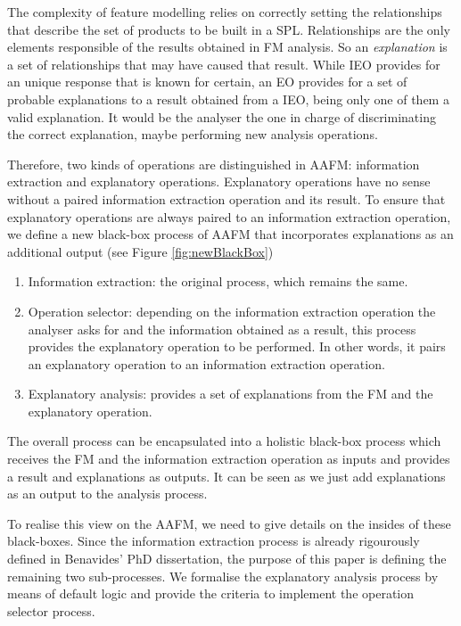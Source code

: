 The complexity of feature modelling relies on correctly setting the relationships that describe the set of products to be built in a SPL. Relationships are the only elements responsible of the results obtained in FM analysis. So an \emph{explanation} is a set of relationships that may have caused that result. While IEO provides for an unique response that is known for certain, an EO provides for a set of probable explanations to a result obtained from a IEO, being only one of them a valid explanation. It would be the analyser the one in charge of discriminating the correct explanation, maybe performing new analysis operations.


Therefore, two kinds of operations are distinguished in AAFM: information extraction and explanatory operations. Explanatory operations have no sense without a paired information extraction operation and its result. To ensure that explanatory operations are always paired to an information extraction operation, we define a new black-box process of AAFM that incorporates explanations as an additional output (see Figure \ref{fig:newBlackBox})

\begin{enumerate}
\item Information extraction: the original process, which remains the same.
\item Operation selector: depending on the information extraction operation the analyser asks for and the information obtained as a result, this process provides the explanatory operation to be performed. In other words, it pairs an explanatory operation to an information extraction operation.
\item Explanatory analysis: provides a set of explanations from the FM and the explanatory operation.
\end{enumerate} 

The overall process can be encapsulated into a holistic black-box process which receives the FM and the information extraction operation as inputs and provides a result and explanations as outputs. It can be seen as we just add explanations as an output to the analysis process. 

To realise this view on the AAFM, we need to give details on the insides of these black-boxes. Since the information extraction process is already rigourously defined in Benavides' PhD dissertation, the purpose of this paper is defining the remaining two sub-processes. We formalise the explanatory analysis process by means of default logic and provide the criteria to implement the operation selector process.

